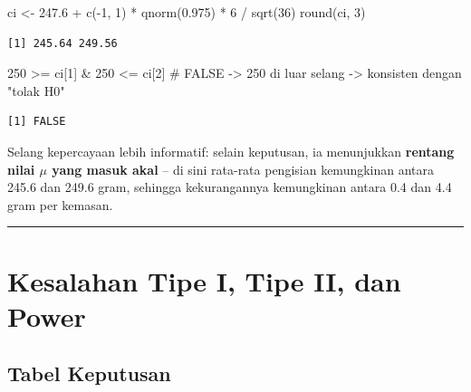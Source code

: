 \documentclass[
  indonesian,
  letterpaper,
]{book}
\newenvironment{Shaded}{\begin{snugshade}}{\end{snugshade}}
\newcommand{\CommentTok}[1]{\textcolor[rgb]{0.37,0.37,0.37}{#1}}
\newcommand{\DecValTok}[1]{\textcolor[rgb]{0.68,0.00,0.00}{#1}}
\newcommand{\FloatTok}[1]{\textcolor[rgb]{0.68,0.00,0.00}{#1}}
\newcommand{\FunctionTok}[1]{\textcolor[rgb]{0.28,0.35,0.67}{#1}}
\newcommand{\NormalTok}[1]{\textcolor[rgb]{0.00,0.23,0.31}{#1}}
\newcommand{\OtherTok}[1]{\textcolor[rgb]{0.00,0.23,0.31}{#1}}
\newcommand{\SpecialCharTok}[1]{\textcolor[rgb]{0.37,0.37,0.37}{#1}}
\begin{document}
\begin{Shaded}
\begin{Highlighting}[]
\NormalTok{ci }\OtherTok{\textless{}{-}} \FloatTok{247.6} \SpecialCharTok{+} \FunctionTok{c}\NormalTok{(}\SpecialCharTok{{-}}\DecValTok{1}\NormalTok{, }\DecValTok{1}\NormalTok{) }\SpecialCharTok{*} \FunctionTok{qnorm}\NormalTok{(}\FloatTok{0.975}\NormalTok{) }\SpecialCharTok{*} \DecValTok{6} \SpecialCharTok{/} \FunctionTok{sqrt}\NormalTok{(}\DecValTok{36}\NormalTok{)}
\FunctionTok{round}\NormalTok{(ci, }\DecValTok{3}\NormalTok{)}
\end{Highlighting}
\end{Shaded}

\begin{verbatim}
[1] 245.64 249.56
\end{verbatim}

\begin{Shaded}
\begin{Highlighting}[]
\DecValTok{250} \SpecialCharTok{\textgreater{}=}\NormalTok{ ci[}\DecValTok{1}\NormalTok{] }\SpecialCharTok{\&} \DecValTok{250} \SpecialCharTok{\textless{}=}\NormalTok{ ci[}\DecValTok{2}\NormalTok{]   }\CommentTok{\# FALSE {-}\textgreater{} 250 di luar selang {-}\textgreater{} konsisten dengan "tolak H0"}
\end{Highlighting}
\end{Shaded}

\begin{verbatim}
[1] FALSE
\end{verbatim}

Selang kepercayaan lebih informatif: selain keputusan, ia menunjukkan
\textbf{rentang nilai \(\mu\) yang masuk akal} -- di sini rata-rata
pengisian kemungkinan antara 245.6 dan 249.6 gram, sehingga
kekurangannya kemungkinan antara 0.4 dan 4.4 gram per kemasan.

\begin{center}\rule{0.5\linewidth}{0.5pt}\end{center}


\chapter{Kesalahan Tipe I, Tipe II, dan
Power}\label{kesalahan-tipe-i-tipe-ii-dan-power}

\section{Tabel Keputusan}\label{tabel-keputusan}
\end{document}
